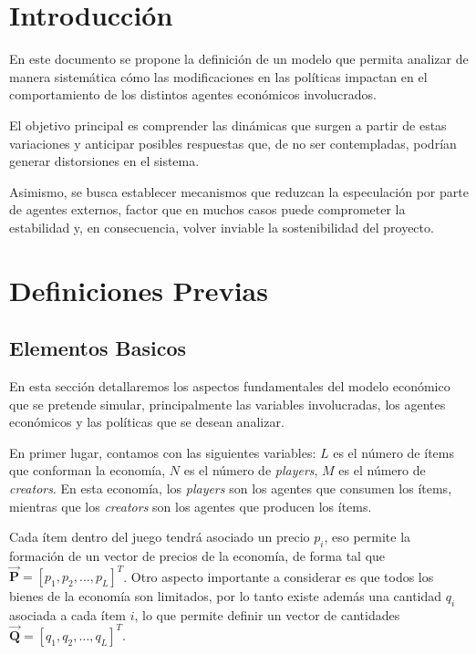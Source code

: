 \section{Introducción}
\vspace{0.25cm}

En este documento se propone la definición de un modelo que permita analizar de manera sistemática cómo las 
modificaciones en las políticas impactan en el comportamiento de los distintos agentes económicos involucrados. 
\vspace{0.25cm}

El objetivo principal es comprender las dinámicas que surgen a partir de estas variaciones y anticipar posibles 
respuestas que, de no ser contempladas, podrían generar distorsiones en el sistema. 
\vspace{0.25cm}

Asimismo, se busca establecer mecanismos que reduzcan la especulación por parte de agentes externos, factor que en 
muchos casos puede comprometer la estabilidad y, en consecuencia, volver inviable la sostenibilidad del proyecto.
\vspace{0.25cm}

\section{Definiciones Previas}
\vspace{0.25cm}

\subsection{Elementos Basicos}
\vspace{0.25cm}

En esta sección detallaremos los aspectos fundamentales del modelo económico que se pretende simular, principalmente
las variables involucradas, los agentes económicos y las políticas que se desean analizar.
\vspace{0.25cm}

En primer lugar, contamos con las siguientes variables: $L$ es el número de ítems que conforman la economía, 
$N$ es el número de \textit{players}, $M$ es el número de \textit{creators}. En esta economía, los \textit{players}
son los agentes que consumen los ítems, mientras que los \textit{creators} son los agentes que producen los ítems.
\vspace{0.25cm}

Cada ítem dentro del juego tendrá asociado un precio $p_i$, eso permite la formación de un vector de precios de la
economía, de forma tal que $\vec{\mathbf{P}} = [p_1, p_2, \ldots, p_L]^T$. Otro aspecto importante a considerar es que 
todos los bienes de la economía son limitados, por lo tanto existe además una cantidad $q_i$ asociada a cada ítem $i$,
lo que permite definir un vector de cantidades $\vec{\mathbf{Q}} = [q_1, q_2, \ldots, q_L]^T$.
\vspace{0.25cm}

